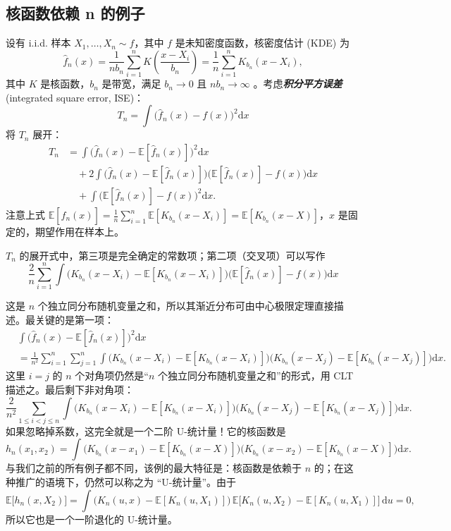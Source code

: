 \subsection{核函数依赖 n 的例子}

设有 i.i.d. 样本 $X_1,\dots,X_n \sim f$，其中 $f$ 是未知密度函数，核密度估计 (KDE) 为
\[\widehat{f}\!_n(x) = \frac{1}{n b_n} \sum_{i=1}^n K\!\left(\frac{x-X_i}{b_n}\right) = \frac{1}{n}\sum_{i=1}^n K_{b_n}(x-X_i),\]
其中 $K$ 是核函数，$b_n$ 是带宽，满足 $b_n\to 0$ 且 $n b_n \to \infty$ 。考虑\textbf{\emph{积分平方误差}} (integrated square error, ISE)：
\[T_n = \int \bigl( \widehat{f}\!_n(x) - f(x) \bigr)^2 \mathrm dx\]
将 $T_n$ 展开：\[\begin{aligned} T_n &= \int \bigl( \widehat{f}\!_n(x) - \mathbb{E}[\widehat{f}\!_n(x) ] \bigr)^2 \mathrm{d}x \\ &\quad + 2 \int \bigl( \widehat{f}\!_n(x) - \mathbb{E}[\widehat{f}\!_n(x) ] \bigr) \bigl( \mathbb{E}[\widehat{f}\!_n(x) ] - f(x) \bigr) \mathrm{d}x \\ &\quad + \int \bigl( \mathbb{E}[\widehat{f}\!_n(x) ] - f(x) \bigr)^2 \mathrm{d}x. \end{aligned}\]注意上式 $\mathbb{E}[\widehat{f}\!_n(x) ] = \frac{1}{n}\sum_{i=1}^n \mathbb{E}[K_{b_n}(x-X_i)] = \mathbb{E}[K_{b_n}(x-X)]$，$x$ 是固定的，期望作用在样本上。

$T_n$ 的展开式中，第三项是完全确定的常数项；第二项（交叉项）可以写作 $$\frac{2}{n}\sum_{i=1}^n \int \bigl( K_{b_n}(x-X_i) - \mathbb{E}[K_{b_n}(x-X_i)] \bigr) \bigl( \mathbb{E}[\widehat{f}\!_n(x) ] - f(x) \bigr) \mathrm{d}x$$

这是 $n$ 个独立同分布随机变量之和，所以其渐近分布可由中心极限定理直接描述。最关键的是第一项：\[\begin{aligned} &\int \bigl( \widehat{f}\!_n(x) - \mathbb{E}[\widehat{f}\!_n(x) ] \bigr)^2 \mathrm{d}x \\ &= \frac{1}{n^2} \sum_{i=1}^n \sum_{j=1}^n \int \bigl( K_{b_n}(x-X_i) - \mathbb{E}[K_{b_n}(x-X_i)] \bigr) \bigl( K_{b_n}(x-X_j) - \mathbb{E}[K_{b_n}(x-X_j)] \bigr) \mathrm{d}x. \end{aligned}\]这里 $i=j$ 的 $n$ 个对角项仍然是``$n$ 个独立同分布随机变量之和''的形式，用 CLT 描述之。最后剩下非对角项：\[\frac{2}{n^2} \sum_{1\le i<j\le n} \int \bigl( K_{b_n}(x-X_i) - \mathbb{E}[K_{b_n}(x-X_i)] \bigr) \bigl( K_{b_n}(x-X_j) - \mathbb{E}[K_{b_n}(x-X_j)] \bigr) \mathrm{d}x.\]如果忽略掉系数，这完全就是一个二阶 U-统计量！它的核函数是\[h_n(x_1,x_2) = \int \bigl( K_{b_n}(x-x_1) - \mathbb{E}[K_{b_n}(x-X)] \bigr) \bigl( K_{b_n}(x-x_2) - \mathbb{E}[K_{b_n}(x-X)] \bigr) \mathrm{d}x.\]与我们之前的所有例子都不同，该例的最大特征是：核函数是依赖于 $n$ 的；在这种推广的语境下，仍然可以称之为 ``U-统计量''。由于\[\mathbb{E}\bigl[h_n(x, X_2) \bigr] = \int \bigl( K_n(u,x) - \mathbb{E}[K_n(u,X_1)] \bigr) \, \mathbb{E}\bigl[ K_n(u,X_2) - \mathbb{E}[K_n(u,X_1)] \bigr] \, \mathrm{d}u = 0,\]
所以它也是一个一阶退化的 U-统计量。


